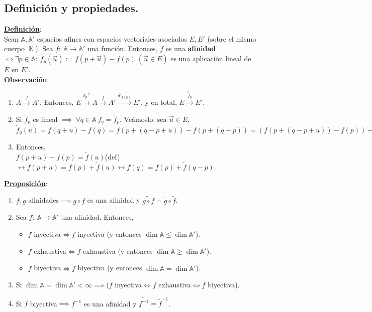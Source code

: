 \documentclass[11pt]{article}
\newcommand{\af}{\mathbb{A}}
\newcommand{\defi}{\underline{\textbf{Definición}}:\\}
\newcommand{\prop}{\underline{\textbf{Proposición}}:\\}
\newcommand{\obs}{\underline{\textbf{Observación}}: }
\DeclareMathOperator{\cuerpo}{\mathbb{K}}
\begin{document}
\subsection{Definición y propiedades.}
\defi Sean $\af,\af'$ espacios afines con espacios vectoriales asociados $E,E'$ (sobre el mismo cuerpo $\cuerpo$). Sea $f:\ \af\rightarrow\af'$ una función. Entonces, $f$ es una \textbf{afinidad}$\iff\exists p\in\af:\ \tilde{f}_p(\vec{u}):=f(p+\vec{u})-f(p)\ (\vec{u}\in E)$ es una aplicación lineal de $E$ en $E'$.\\
\obs \begin{enumerate}
	\item $A\xrightarrow{f}A'$. Entonces, $E\xrightarrow{\delta_p^{-1}}A\xrightarrow{f}A'\xrightarrow{\delta'_{f(p)}}E'$, y en total, $E\xrightarrow{\tilde{f}_p}E'$.
	\item Si $\tilde{f}_p$ es lineal $\implies\ \forall q\in\af\ \tilde{f}_q=\tilde{f}_p.$ Veámoslo: sea $\vec{u}\in E$,\\
	$\tilde{f}_q(u)=f(q+u)-f(q)=f(p+(q-p+u))-f(p+(q-p))=(f(p+(q-p+u))-f(p))-(f(p+(q-p))-f(p))=\tilde{f}_p((q-p)+u)-\tilde{f}_p(q-p)=\tilde{f}_p(u)+\tilde{f}_p(q-p)-\tilde{f}_p(q-p)=\tilde{f}_p(u).\square$
	\item Entonces,\\
	$f(p+u)-f(p)=\tilde{f}(u)$(def)$\leftrightarrow f(p+u)=f(p)+\tilde{f}(u)\leftrightarrow f(q)=f(p)+\tilde{f}(q-p).$
\end{enumerate}
\prop \begin{enumerate}
	\item $f,g$ afinidades$\implies g\circ f$ es una afinidad y $\tilde{g\circ f}=\tilde{g}\circ\tilde{f}$.
	\item Sea $f:\ \af\rightarrow\af'$ una afinidad. Entonces,
	\begin{itemize}
		\item $f$ inyectiva$\iff\tilde{f}$ inyectiva (y entonces $\dim\af\leq\dim\af'$).
		\item $f$ exhaustiva$\iff\tilde{f}$ exhaustiva (y entonces $\dim\af\geq\dim\af'$).
		\item $f$ biyectiva$\iff\tilde{f}$ biyectiva (y entonces $\dim\af=\dim\af'$).
	\end{itemize}
	\item Si $\dim\af=\dim\af'<\infty\implies$($f$ inyectiva$\iff f$ exhaustiva$\iff f$ biyectiva).
	\item Si $f$ biyectiva$\implies f^{-1}$ es una afinidad y $\tilde{f^{-1}}=\tilde{f}^{-1}$.
\end{enumerate}
\end{document}
